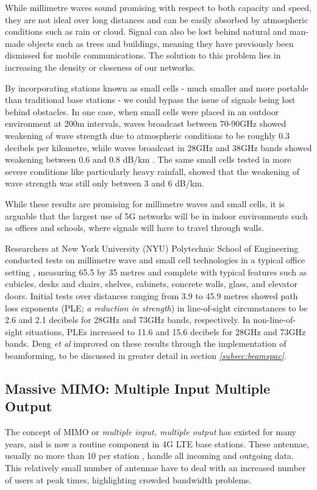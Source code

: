 \documentclass[journal]{IEEEtran}
\begin{document}
While millimetre waves sound promising with respect to both capacity and speed, they are not ideal over long distances and can be easily absorbed by atmospheric conditions such as rain or cloud. Signal can also be lost behind natural and man-made objects such as trees and buildings, meaning they have previously been dismissed for mobile communications. The solution to this problem lies in increasing the density or closeness of our networks. 

By incorporating stations known as small cells - much smaller and more portable than traditional base stations - we could bypass the issue of signals being lost behind obstacles. In one case, when small cells were placed in an outdoor environment at 200m intervals, waves broadcast between 70-90GHz showed weakening of wave strength due to atmospheric conditions to be roughly 0.3 decibels per kilometre, while waves broadcast in 28GHz and 38GHz bands showed weakening between 0.6 and 0.8 dB/km \cite{mmwave}. The same small cells tested in more severe conditions like particularly heavy rainfall, showed that the weakening of wave strength was still only between 3 and 6 dB/km. 

While these results are promising for millimetre waves and small cells, it is arguable that the largest use of 5G networks will be in indoor environments such as offices and schools, where signals will have to travel through walls. 

Researchers at New York University (NYU) Polytechnic School of Engineering conducted tests on millimetre wave and small cell technologies in a typical office setting \cite{28_73ghz}, measuring 65.5 by 35 metres and complete with typical features such as cubicles, desks and chairs, shelves, cabinets, concrete walls, glass, and elevator doors. Initial tests over distances ranging from 3.9 to 45.9 metres showed path loss exponents (PLE; \textit{a reduction in strength}) in line-of-sight circumstances to be 2.6 and 2.1 decibels for 28GHz and 73GHz bands, respectively. In non-line-of-sight situations, PLEs increased to 11.6 and 15.6 decibels for 28GHz and 73GHz bands. Deng \textit{et al} improved on these results through the implementation of beamforming, to be discussed in greater detail in section \textit{\ref{subsec:beamspac}}.

\subsection{Massive MIMO: Multiple Input Multiple Output}
The concept of MIMO or \textit{multiple input, multiple output} has existed for many years, and is now a routine component in 4G LTE base stations. These antennae, usually no more than 10 per station \cite{mimo}, handle all incoming and outgoing data. This relatively small number of antennae have to deal with an increased number of users at peak times, highlighting crowded bandwidth problems.
\end{document}

